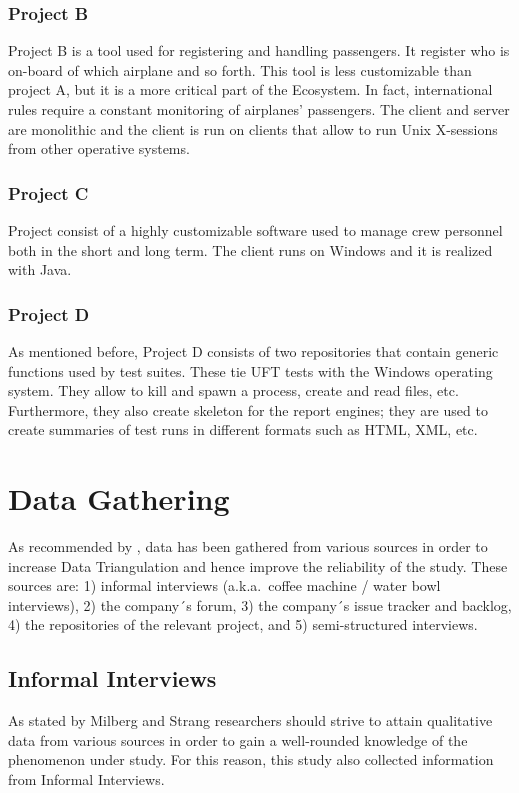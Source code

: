 \subsubsection{Project B}
Project B is a tool used for registering and handling passengers. It register who is on-board of which airplane and so forth. This tool is less customizable than project A, but it is a more critical part of the Ecosystem. In fact, international rules require a constant monitoring of airplanes' passengers. The client and server are monolithic and the client is run on clients that allow to run Unix X-sessions from other operative systems.

\subsubsection{Project C}
Project  consist of a highly customizable software used to manage crew personnel both in the short and long term. The client runs on Windows and it is realized with Java.

\subsubsection{Project D}
As mentioned before, Project D consists of two repositories that contain generic functions used by test suites. These tie UFT tests with the Windows operating system. They allow to kill and spawn a process, create and read files, etc. Furthermore, they also create skeleton for the report engines; they are used to create summaries of test runs in different formats such as HTML, XML, etc.

%
%
%
%

%
%
%
%
\section{Data Gathering}
As recommended by \cite{case_study_guide,case_study_software_engineering}, data has been gathered from various sources in order to increase Data Triangulation and hence improve the reliability of the study. These sources are: 1) informal interviews (a.k.a.\ coffee machine / water bowl interviews), 2) the company´s forum, 3) the company´s issue tracker and backlog, 4) the repositories of the relevant project, and 5) semi-structured interviews.


\subsection{Informal Interviews}
As stated by Milberg and Strang \cite{informal_interview} researchers should strive to attain qualitative data from various sources in order to gain a well-rounded knowledge of the phenomenon under study. For this reason, this study also collected information from Informal Interviews.

